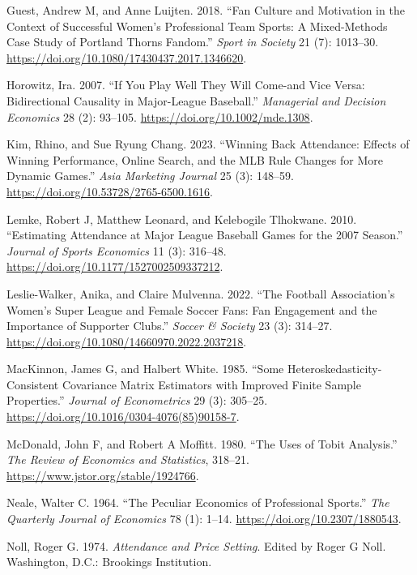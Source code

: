 \documentclass[
  letterpaper,
  DIV=11,
  numbers=noendperiod]{scrartcl}
\newlength{\cslhangindent}
\newenvironment{CSLReferences}[2] %
 {\begin{list}{}{%
  \setlength{\itemindent}{0pt}
  \setlength{\leftmargin}{0pt}
  \setlength{\parsep}{0pt}
  \ifodd #1
   \setlength{\leftmargin}{\cslhangindent}
   \setlength{\itemindent}{-1\cslhangindent}
  \fi
  \setlength{\itemsep}{#2\baselineskip}}}
 {\end{list}}
\begin{document}
\begin{CSLReferences}{1}{1}
Guest, Andrew M, and Anne Luijten. 2018. {``Fan Culture and Motivation
in the Context of Successful Women's Professional Team Sports: A
Mixed-Methods Case Study of Portland Thorns Fandom.''} \emph{Sport in
Society} 21 (7): 1013--30.
\url{https://doi.org/10.1080/17430437.2017.1346620}.

Horowitz, Ira. 2007. {``If You Play Well They Will Come-and Vice Versa:
Bidirectional Causality in Major-League Baseball.''} \emph{Managerial
and Decision Economics} 28 (2): 93--105.
\url{https://doi.org/10.1002/mde.1308}.

Kim, Rhino, and Sue Ryung Chang. 2023. {``Winning Back Attendance:
Effects of Winning Performance, Online Search, and the MLB Rule Changes
for More Dynamic Games.''} \emph{Asia Marketing Journal} 25 (3):
148--59. \url{https://doi.org/10.53728/2765-6500.1616}.

Lemke, Robert J, Matthew Leonard, and Kelebogile Tlhokwane. 2010.
{``Estimating Attendance at Major League Baseball Games for the 2007
Season.''} \emph{Journal of Sports Economics} 11 (3): 316--48.
\url{https://doi.org/10.1177/1527002509337212}.

Leslie-Walker, Anika, and Claire Mulvenna. 2022. {``The Football
Association's Women's Super League and Female Soccer Fans: Fan
Engagement and the Importance of Supporter Clubs.''} \emph{Soccer \&
Society} 23 (3): 314--27.
\url{https://doi.org/10.1080/14660970.2022.2037218}.

MacKinnon, James G, and Halbert White. 1985. {``Some
Heteroskedasticity-Consistent Covariance Matrix Estimators with Improved
Finite Sample Properties.''} \emph{Journal of Econometrics} 29 (3):
305--25. \url{https://doi.org/10.1016/0304-4076(85)90158-7}.

McDonald, John F, and Robert A Moffitt. 1980. {``The Uses of {Tobit}
Analysis.''} \emph{The Review of Economics and Statistics}, 318--21.
\url{https://www.jstor.org/stable/1924766}.

Neale, Walter C. 1964. {``The Peculiar Economics of Professional
Sports.''} \emph{The Quarterly Journal of Economics} 78 (1): 1--14.
\url{https://doi.org/10.2307/1880543}.

Noll, Roger G. 1974. \emph{Attendance and Price Setting}. Edited by
Roger G Noll. Washington, D.C.: Brookings Institution.


\end{CSLReferences}
\end{document}
